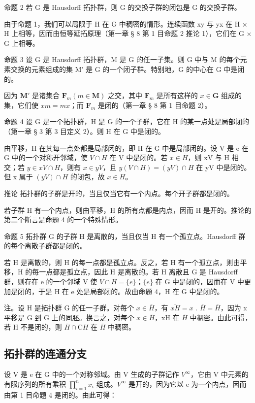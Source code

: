 命题 2 若 G 是 Hausdorff 拓扑群，则 G 的交换子群的闭包是 G 的交换子群。

由于命题 1，我们可以局限于 H 在 G 中稠密的情形。连续函数 xy 与 yx 在 H × H 上相等，因而由恒等延拓原理（第一章 § 8 第 1 目命题 2 推论 1），它们在 G × G 上相等。

命题 3 设 G 是 Hausdorff 拓扑群，M 是 G 的任一子集。则 G 中与 M 的每个元素交换的元素组成的集 M' 是 G 的一个闭子群。特别地，G 的中心在 G 中是闭的。

因为 \(\mathbf{M}'\) 是诸集合 \(\mathbf{F}_m(m \in \mathbf{M})\) 之交，其中 \(\mathbf{F}_m\) 是所有这样的 \(x \in \mathbf{G}\) 组成的集，它们使 \(xm = mx\)；而 \(\mathbf{F}_m\) 是闭的（第一章 § 8 第 1 目命题 2）。

命题 4 设 G 是一个拓扑群，H 是 G 的一个子群，它在 H 的某一点处是局部闭的（第一章 § 3 第 3 目定义 2）。则 H 在 G 中是闭的。

由平移，H 在其每一点处都是局部闭的，即 H 在 G 中是局部闭的。设 V 是 e 在 G 中的一个对称开邻域，使 \(V \cap H\) 在 V 中是闭的。若 \(x \in \overline{H}\)，则 xV 与 H 相交；若 \(y \in xV \cap H\)，则有 \(x \in yV\)，且 \(y(V \cap H) = (yV) \cap H\) 在 yV 中是闭的。但 x 属于 \((yV) \cap H\) 的闭包，故 \(x \in H\)。

推论 拓扑群的子群是开的，当且仅当它有一个内点。每个开子群都是闭的。

若子群 H 有一个内点，则由平移，H 的所有点都是内点，因而 H 是开的。推论的第二个断言是命题 4 的一个特殊情形。

命题 5 拓扑群 G 的子群 H 是离散的，当且仅当 H 有一个孤立点。Hausdorff 群的每个离散子群都是闭的。

若 H 是离散的，则 H 的每一点都是孤立点。反之，若 H 有一个孤立点，则由平移，H 的每一点都是孤立点，因此 H 是离散的。若 H 离散且 G 是 Hausdorff 群，则存在 e 的一个邻域 V 使 \(V \cap H = \{e\}\)；\(\{e\}\) 在 G 中是闭的，因而在 V 中更加是闭的，于是 H 在 e 处是局部闭的。故由命题 4，H 在 G 中是闭的。

注。设 H 是拓扑群 G 的任一子群。对每个 \(x \in \overline{H}\)，有 \(\overline{xH} = x\) . \(\overline{H} = \overline{H}\)，因为 x 平移是 G 到 G 上的同胚。换言之，对每个 \(x \in \overline{H}\)，xH 在 \(\overline{H}\) 中稠密。由此可得，若 H 不是闭的，则 \(\overline{H} \cap \mathrm{C}H\) 在 \(\overline{H}\) 中稠密。

\subsection{拓扑群的连通分支}

设 V 是 e 在 G 中的一个对称邻域。由 V 生成的子群记作 \(V^{\infty}\)，它由 V 中元素的有限序列的所有乘积 \(\prod_{i=1}^{n} x_{i}\) 组成。\(V^{\infty}\) 是开的，因为它以 e 为一个内点，因而由第 1 目命题 4 是闭的。由此可得：

